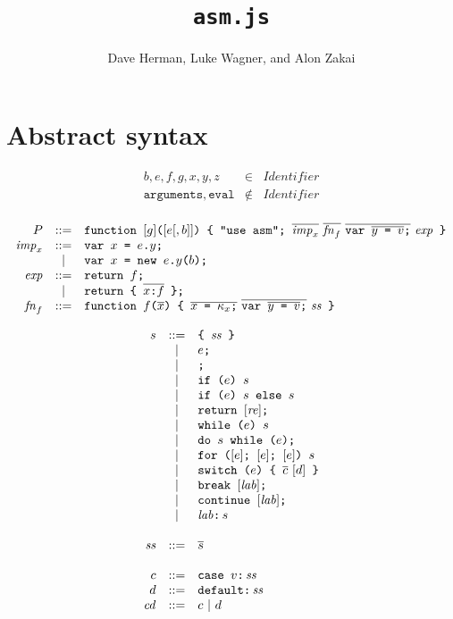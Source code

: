\documentclass{article}
\newcommand{\funcall}[2]{{#1}\mathjs{(}{#2}\mathjs{)}}
\newcommand{\seq}[1]{\overline{{#1}}}
\newcommand{\mathjs}[1]{\mbox{\texttt{{#1}}}}
\newcommand{\return}[1]{\mathjs{return }{#1}\mathjs{;}}
\newcommand{\fun}[3]{\mathjs{function }{#1}\mathjs{(}{#2}\mathjs{) \char123{} }{#3}\mathjs{ \char125{}}}
\newcommand{\var}[1]{\mathjs{var }{#1}\mathjs{;}}
\newcommand{\while}[2]{\mathjs{while (}{#1}\mathjs{) }{#2}}
\newcommand{\dowhile}[2]{\mathjs{do }{#1}\mathjs{ while (}{#2}\mathjs{);}}
\newcommand{\for}[4]{\mathjs{for (}{#1}\mathjs{; }{#2}\mathjs{; }{#3}\mathjs{) }{#4}}
\newcommand{\switch}[2]{\mathjs{switch (}{#1}\mathjs{) \char123{} }{#2}\mathjs{ \char125{}}}
\newcommand{\brkl}[1]{\mathjs{break }{#1}\mathjs{;}}
\newcommand{\contl}[1]{\mathjs{continue }{#1}\mathjs{;}}
\newcommand{\lab}[2]{{#1}\mathjs{:}\,{#2}}
\newcommand{\ifthen}[2]{\mathjs{if (}{#1}\mathjs{) }{#2}}
\newcommand{\ifthenelse}[3]{\mathjs{if (}{#1}\mathjs{) }{#2}\mathjs{ else }{#3}}
\newcommand{\block}[1]{\mathjs{\char123{} }{#1}\mathjs{ \char125{}}}
\begin{document}
\title{\texttt{asm.js}}
\author{Dave Herman, Luke Wagner, and Alon Zakai}
\maketitle

\section{Abstract syntax}

\[
\begin{array}{rcl}
b, e, f, g, x, y, z               & \in & \mathit{Identifier} \\
\mathtt{arguments}, \mathtt{eval} & \not\in & \mathit{Identifier} \\
\end{array}
\]

\[
\begin{array}{rcl}
P               & ::= & \fun{[g]}{[e[, b]]}{\mathjs{"use asm"; } \seq{\mathit{imp}_x}\ \seq{\mathit{fn}_f}\ \seq{\var{\seq{y \mathjs{ = } v}}}\ \mathit{exp}} \\
\mathit{imp}_x  & ::= & \var{x \mathjs{ = } e\mathjs{.}y} \\
                &  |  & \var{x \mathjs{ = } \mathjs{new }\funcall{e\mathjs{.}y}{b}} \\
\mathit{exp}    & ::= & \return{f} \\
                &  |  & \return{\mathjs{\char123{} } \seq{x \mathjs{:} f} \mathjs{ \char125{}}} \\
\mathit{fn}_f   & ::= & \fun{f}{\seq{x}}{\seq{x\mathjs{ = }\kappa_x\mathjs{;}}\ \seq{\var{\seq{y\mathjs{ = }v}}}\ \mathit{ss}} \\
\end{array}
\]

\[
\begin{array}{rcl}
s & ::= & \block{\mathit{ss}} \\
  &  |  & e\mathjs{;} \\
  &  |  & \mathjs{;} \\
  &  |  & \ifthen{e}{s} \\
  &  |  & \ifthenelse{e}{s}{s} \\
  &  |  & \return{[\mathit{re}]} \\
  &  |  & \while{e}{s} \\
  &  |  & \dowhile{s}{e} \\
  &  |  & \for{[e]}{[e]}{[e]}{s} \\
  &  |  & \switch{e}{\seq{c}\ [d]} \\
  &  |  & \brkl{[\mathit{lab}]} \\
  &  |  & \contl{[\mathit{lab}]} \\
  &  |  & \lab{\mathit{lab}}{s} \\
\\
\mathit{ss} & ::= & \seq{s} \\
\\
c & ::= & \mathjs{case }v\mathjs{:}\,\mathit{ss} \\
d & ::= & \mathjs{default:}\,\mathit{ss} \\
\mathit{cd} & ::= & c ~|~ d \\
\end{array}
\]
\end{document}
